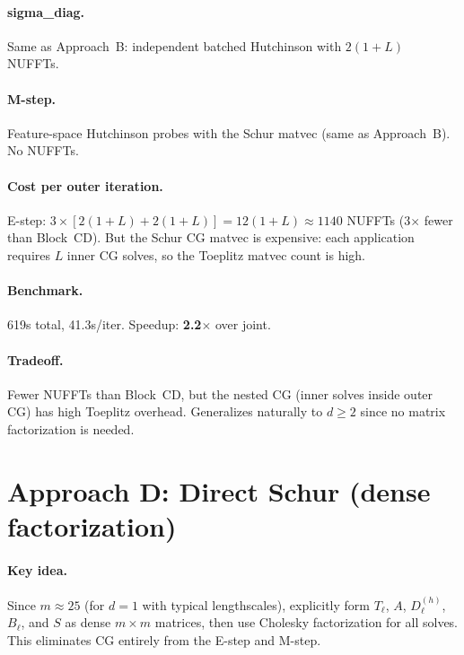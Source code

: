 \documentclass[11pt]{article}
\begin{document}
\paragraph{sigma\_diag.} Same as Approach~B: independent batched
Hutchinson with $2(1{+}L)$ NUFFTs.

\paragraph{M-step.} Feature-space Hutchinson probes with the
Schur matvec (same as Approach~B). No NUFFTs.

\paragraph{Cost per outer iteration.}
E-step: $3 \times [2(1{+}L) + 2(1{+}L)] = 12(1{+}L) \approx 1140$
NUFFTs (3$\times$ fewer than Block~CD). But the Schur CG matvec
is expensive: each application requires $L$ inner CG solves,
so the Toeplitz matvec count is high.

\paragraph{Benchmark.} 619s total, 41.3s/iter.
Speedup: \textbf{2.2$\times$} over joint.

\paragraph{Tradeoff.} Fewer NUFFTs than Block~CD, but the nested
CG (inner solves inside outer CG) has high Toeplitz overhead.
Generalizes naturally to $d \geq 2$ since no matrix factorization
is needed.

\section{Approach D: Direct Schur (dense factorization)}

\paragraph{Key idea.} Since $m \approx 25$ (for $d{=}1$ with
typical lengthscales), explicitly form $T_\ell$, $A$, $D_\ell^{(h)}$,
$B_\ell$, and $S$ as dense $m{\times}m$ matrices, then use Cholesky
factorization for all solves. This eliminates CG entirely from the
E-step and M-step.
\end{document}
